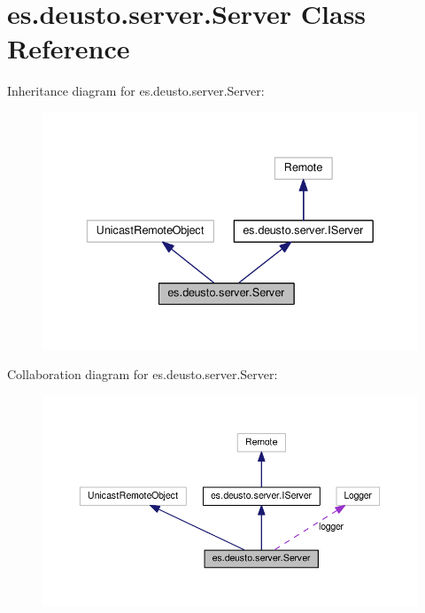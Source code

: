 \hypertarget{classes_1_1deusto_1_1server_1_1_server}{}\section{es.\+deusto.\+server.\+Server Class Reference}
\label{classes_1_1deusto_1_1server_1_1_server}


Inheritance diagram for es.\+deusto.\+server.\+Server\+:\nopagebreak
\begin{figure}[H]
\begin{center}
\leavevmode
\includegraphics[width=336pt]{classes_1_1deusto_1_1server_1_1_server__inherit__graph}
\end{center}
\end{figure}


Collaboration diagram for es.\+deusto.\+server.\+Server\+:\nopagebreak
\begin{figure}[H]
\begin{center}
\leavevmode
\includegraphics[width=350pt]{classes_1_1deusto_1_1server_1_1_server__coll__graph}
\end{center}
\end{figure}
